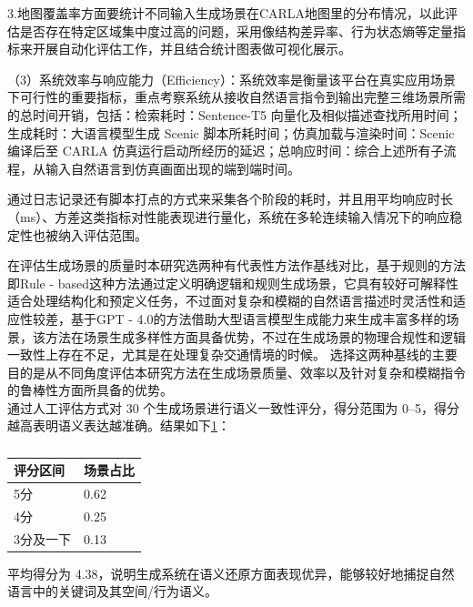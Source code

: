 3.地图覆盖率方面要统计不同输入生成场景在CARLA地图里的分布情况，以此评估是否存在特定区域集中度过高的问题，采用像结构差异率、行为状态熵等定量指标来开展自动化评估工作，并且结合统计图表做可视化展示。

（3）系统效率与响应能力（Efficiency）：系统效率是衡量该平台在真实应用场景下可行性的重要指标，重点考察系统从接收自然语言指令到输出完整三维场景所需的总时间开销，包括：检索耗时：Sentence-T5 向量化及相似描述查找所用时间；生成耗时：大语言模型生成 Scenic 脚本所耗时间；仿真加载与渲染时间：Scenic 编译后至 CARLA 仿真运行启动所经历的延迟；总响应时间：综合上述所有子流程，从输入自然语言到仿真画面出现的端到端时间。

通过日志记录还有脚本打点的方式来采集各个阶段的耗时，并且用平均响应时长（ms）、方差这类指标对性能表现进行量化，系统在多轮连续输入情况下的响应稳定性也被纳入评估范围。

在评估生成场景的质量时本研究选两种有代表性方法作基线对比，基于规则的方法即Rule - based这种方法通过定义明确逻辑和规则生成场景，它具有较好可解释性适合处理结构化和预定义任务，不过面对复杂和模糊的自然语言描述时灵活性和适应性较差，基于GPT - 4.0的方法借助大型语言模型生成能力来生成丰富多样的场景，该方法在场景生成多样性方面具备优势，不过在生成场景的物理合规性和逻辑一致性上存在不足，尤其是在处理复杂交通情境的时候。
选择这两种基线的主要目的是从不同角度评估本研究方法在生成场景质量、效率以及针对复杂和模糊指令的鲁棒性方面所具备的优势。\\
通过人工评估方式对 30 个生成场景进行语义一致性评分，得分范围为 0–5，得分越高表明语义表达越准确。结果如下\ref{tab:dependencies}：
\begin{table}[htbp]
	\centering
	\large %
	\begin{tabular}{ll}
		\hline
		\textbf{评分区间} & \textbf{场景占比} \\
		\hline
		5分 & 0.62 \\
		4分 & 0.25 \\
		3分及一下 & 0.13 \\
		\hline
	\end{tabular}
	\caption{}
	\label{tab:dependencies}
\end{table}



平均得分为 4.38，说明生成系统在语义还原方面表现优异，能够较好地捕捉自然语言中的关键词及其空间/行为语义。

